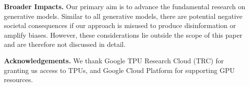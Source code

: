 \noindent\textbf{Broader Impacts.}  Our primary aim is to advance the fundamental research on generative models.
Similar to all generative models, there are potential negative societal consequences if our approach is misused to produce disinformation or amplify biases. However, these considerations lie outside the scope of this paper and are therefore not discussed in detail.

\noindent\textbf{Acknowledgements.} We thank Google TPU Research
Cloud (TRC) for granting us access to TPUs, and Google Cloud Platform for supporting GPU resources.